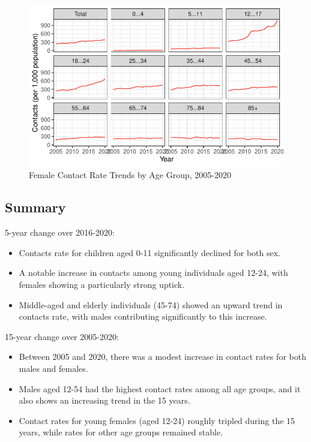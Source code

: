 \documentclass[
  a4paper,
  DIV=11,
  numbers=noendperiod]{scrreport}
\begin{document}
\begin{figure}

\caption{\label{fig-cmhc-caf}Female Contact Rate Trends by Age Group,
2005-2020}

{\centering \includegraphics{./chap2-cmhc_files/figure-pdf/fig-cmhc-caf-1.pdf}

}

\end{figure}

\hypertarget{summary-4}{%
\subsection{Summary}\label{summary-4}}

5-year change over 2016-2020:

\begin{itemize}
\item
  Contacts rate for children aged 0-11 significantly declined for both
  sex.
\item
  A notable increase in contacts among young individuals aged 12-24,
  with females showing a particularly strong uptick.
\item
  Middle-aged and elderly individuals (45-74) showed an upward trend in
  contacts rate, with males contributing significantly to this increase.
\end{itemize}

15-year change over 2005-2020:

\begin{itemize}
\item
  Between 2005 and 2020, there was a modest increase in contact rates
  for both males and females.
\item
  Males aged 12-54 had the highest contact rates among all age groups,
  and it also shows an increasing trend in the 15 years.
\item
  Contact rates for young females (aged 12-24) roughly tripled during
  the 15 years, while rates for other age groups remained stable.
\end{itemize}
\end{document}
